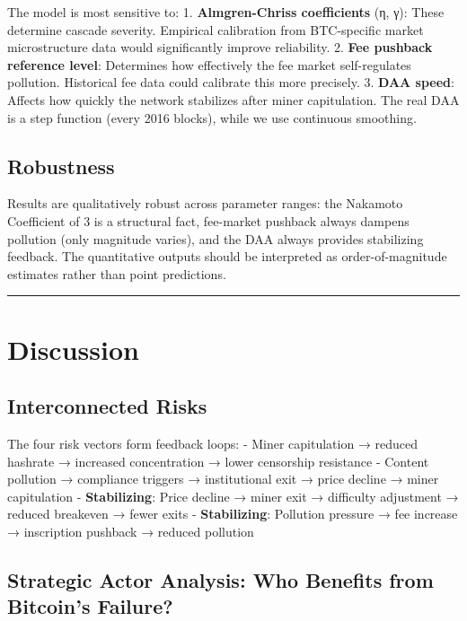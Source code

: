\documentclass[
  11pt,
]{article}
\let\oldsection\section
\renewcommand{\section}[1]{\FloatBarrier\oldsection{#1}}
\let\oldsubsection\subsection
\renewcommand{\subsection}[1]{\FloatBarrier\oldsubsection{#1}}
\begin{document}
The model is most sensitive to: 1. \textbf{Almgren-Chriss coefficients}
(η, γ): These determine cascade severity. Empirical calibration from
BTC-specific market microstructure data would significantly improve
reliability. 2. \textbf{Fee pushback reference level}: Determines how
effectively the fee market self-regulates pollution. Historical fee data
could calibrate this more precisely. 3. \textbf{DAA speed}: Affects how
quickly the network stabilizes after miner capitulation. The real DAA is
a step function (every 2016 blocks), while we use continuous smoothing.

\hypertarget{robustness}{%
\subsection{Robustness}\label{robustness}}

Results are qualitatively robust across parameter ranges: the Nakamoto
Coefficient of 3 is a structural fact, fee-market pushback always
dampens pollution (only magnitude varies), and the DAA always provides
stabilizing feedback. The quantitative outputs should be interpreted as
order-of-magnitude estimates rather than point predictions.

\begin{center}\rule{0.5\linewidth}{0.5pt}\end{center}

\hypertarget{discussion}{%
\section{Discussion}\label{discussion}}

\hypertarget{interconnected-risks}{%
\subsection{Interconnected Risks}\label{interconnected-risks}}

The four risk vectors form feedback loops: - Miner capitulation →
reduced hashrate → increased concentration → lower censorship resistance
- Content pollution → compliance triggers → institutional exit → price
decline → miner capitulation - \textbf{Stabilizing}: Price decline →
miner exit → difficulty adjustment → reduced breakeven → fewer exits -
\textbf{Stabilizing}: Pollution pressure → fee increase → inscription
pushback → reduced pollution

\hypertarget{strategic-actor-analysis-who-benefits-from-bitcoins-failure}{%
\subsection{Strategic Actor Analysis: Who Benefits from Bitcoin's
Failure?}\label{strategic-actor-analysis-who-benefits-from-bitcoins-failure}}
\end{document}

